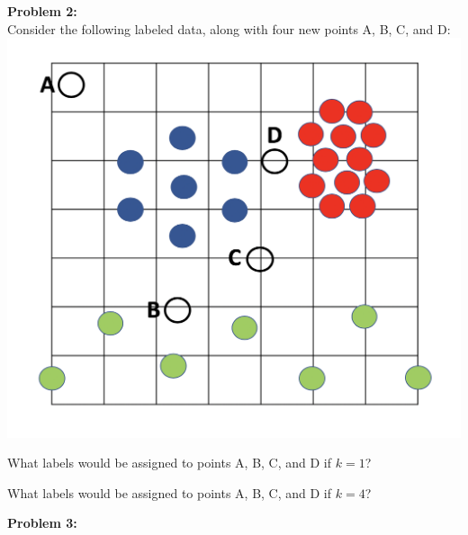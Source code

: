 \documentclass[a4paper]{article}
\newif\ifsol
\begin{document}
    \noindent \textbf{Problem 2:}\\
    
    \noindent Consider the following labeled data, along with four new points A, B, C, and D: \\
    \includegraphics[scale=0.5]{figs/knn.png}
    
    \noindent What labels would be assigned to points A, B, C, and D if $k = 1$? \\
    \ifsol {\color{blue} A is blue, B is green, C is blue, D is blue.}
    \else \bigskip \bigskip \bigskip \bigskip \bigskip
    \fi
    \bigskip
    
    \noindent What labels would be assigned to points A, B, C, and D if $k = 4$? \\
    \ifsol {\color{blue} A is blue, B is green, C is blue, D is red.}
    \else \bigskip \bigskip \bigskip \bigskip \bigskip \bigskip
    \fi
    \bigskip
    
    \noindent \textbf{Problem 3:}\\
    
\end{document}
